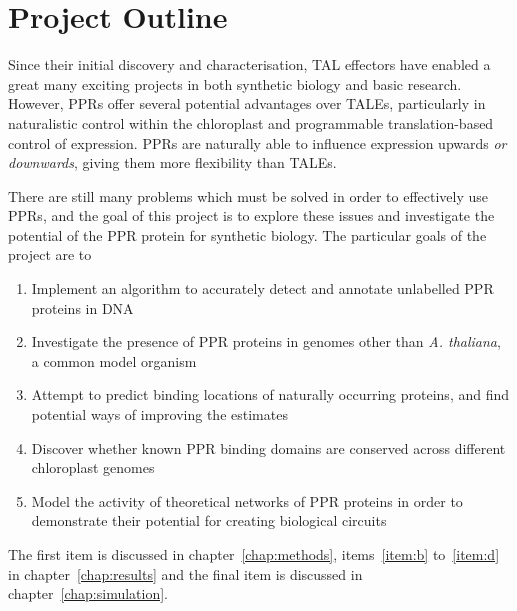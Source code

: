 \section{Project Outline}

Since their initial discovery and characterisation, TAL effectors have enabled
a great many exciting projects in both synthetic biology and basic research.
However, PPRs offer several potential advantages over TALEs, particularly in 
naturalistic control within the chloroplast and programmable translation-based 
control of expression.
PPRs are naturally able to influence expression upwards \emph{or downwards},
giving them more flexibility than TALEs.

There are still many problems which must be solved in order to effectively use
PPRs, and the goal of this project is to explore these issues and investigate
the potential of the PPR protein for synthetic biology.
The particular goals of the project are to
\begin{enumerate}
  \item \label{item:a}
    Implement an algorithm to accurately detect and annotate unlabelled PPR
    proteins in DNA
  \item \label{item:b}
    Investigate the presence of PPR proteins in genomes other than 
    \emph{A. thaliana}, a common model organism
  \item \label{item:c}
    Attempt to predict binding locations of naturally occurring proteins, and
    find potential ways of improving the estimates
  \item \label{item:d}
    Discover whether known PPR binding domains are conserved across different 
    chloroplast genomes
  \item \label{item:e} 
    Model the activity of theoretical networks of PPR proteins in order to
    demonstrate their potential for creating biological circuits
\end{enumerate}

The first item is discussed in chapter~\ref{chap:methods}, items~\ref{item:b}
to~\ref{item:d} in chapter~\ref{chap:results} and the final item is discussed
in chapter~\ref{chap:simulation}.

